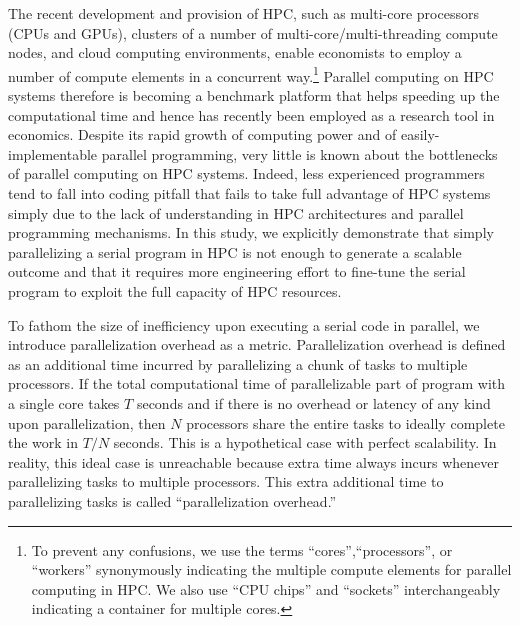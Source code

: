 \documentclass[12pt]{article}
\begin{document}
The recent development and provision of HPC, such as multi-core processors (CPUs and GPUs), clusters of a number of multi-core/multi-threading compute nodes, and cloud computing environments, enable economists to employ a number of compute elements in a concurrent way.\footnote{\sf To prevent any confusions, we use the terms ``cores'',``processors'', or ``workers'' synonymously indicating the multiple compute elements for parallel computing in HPC. We also use ``CPU chips'' and ``sockets'' interchangeably indicating a container for multiple cores.} Parallel computing on HPC systems therefore is becoming a benchmark platform that helps speeding up the computational time and hence has recently been employed as a research tool in economics. Despite its rapid growth of computing power and of easily-implementable parallel programming, very little is known about the bottlenecks of parallel computing on HPC systems. Indeed, less experienced programmers tend to fall into coding pitfall that fails to take full advantage of HPC systems simply due to the lack of understanding in HPC architectures and parallel programming mechanisms. In this study, we explicitly demonstrate that simply parallelizing a serial program in HPC is not enough to generate a scalable outcome and that it requires more engineering effort to fine-tune the serial program to exploit the full capacity of HPC resources.

To fathom the size of inefficiency upon executing a serial code in parallel, we introduce parallelization overhead as a metric. Parallelization overhead is defined as an additional time incurred by parallelizing a chunk of tasks to multiple processors. If the total computational time of parallelizable part of program with a single core takes $T$ seconds and if there is no overhead or latency of any kind upon parallelization, then $N$ processors share the entire tasks to ideally complete the work in $T/N$ seconds. This is a hypothetical case with perfect scalability. In reality, this ideal case is unreachable because extra time always incurs whenever parallelizing tasks to multiple processors. This extra additional time to parallelizing tasks is called ``parallelization overhead.''
\end{document}
